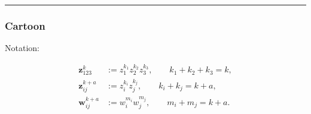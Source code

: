 \documentclass[11pt]{article}
\begin{document}
\newpage


\begin{center}\rule{0.5\linewidth}{0.5pt}\end{center}

\hypertarget{cartoon}{%
	\subsubsection{Cartoon}\label{cartoon}}

Notation:

\begin{equation*}
	\begin{split}
		\mathbf{z}_{123}^{k} &:= z_{1}^{k_{1}} z_{2}^{k_{2}} z_{3}^{k_{3}}, \qquad k_{1} + k_{2} + k_{3} = k, \\
		\mathbf{z}_{ij}^{k+a} &:= z_{i}^{k_{i}} z_{j}^{k_{j}}, \qquad k_{i} + k_{j} = k + a, \\
		\mathbf{w}_{ij}^{k+a} &:= w_{i}^{m_{i}} w_{j}^{m_{j}}, \qquad m_{i} + m_{j} = k + a.
	\end{split}
\end{equation*}
\end{document}
